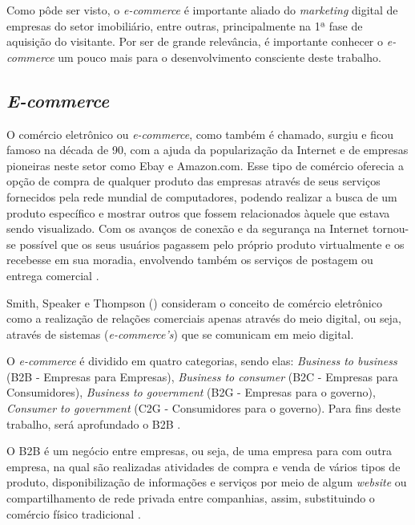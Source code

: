 Como pôde ser visto, o \textit{e-commerce} é importante aliado do \textit{marketing} digital de empresas do setor imobiliário, entre outras, principalmente na 1ª fase de aquisição do visitante. Por ser de grande relevância, é importante conhecer o \textit{e-commerce} um pouco mais para o desenvolvimento consciente deste trabalho.

\subsection{\textit{E-commerce}}

O comércio eletrônico ou \textit{e-commerce}, como também é chamado, surgiu e ficou famoso na década de 90, com a ajuda da popularização da Internet e de empresas pioneiras neste setor como Ebay e Amazon.com. Esse tipo de comércio oferecia a opção de compra de qualquer produto das empresas através de seus serviços fornecidos pela rede mundial de computadores, podendo realizar a busca de um produto específico e mostrar outros que fossem relacionados àquele que estava sendo visualizado. Com os avanços de conexão e da segurança na Internet tornou-se possível que os seus usuários pagassem pelo próprio produto virtualmente e os recebesse em sua moradia, envolvendo também os serviços de postagem ou entrega comercial \cite{Nakamura:2011}.

Smith, Speaker e Thompson (\citeyear{smith2000mais}) consideram o conceito de comércio eletrônico como a realização de relações comerciais apenas através do meio digital, ou seja, através de sistemas (\textit{e-commerce's}) que se comunicam em meio digital.

O \textit{e-commerce} é dividido em quatro categorias, sendo elas: \textit{Business to business} (B2B - Empresas para Empresas), \textit{Business to consumer} (B2C - Empresas para Consumidores), \textit{Business to government} (B2G - Empresas para o governo), \textit{Consumer to government} (C2G - Consumidores para o governo). Para fins deste trabalho, será aprofundado o B2B \cite{Nakamura:2011}.

O B2B é um negócio entre empresas, ou seja, de uma empresa para com outra empresa, na qual são realizadas atividades de compra e venda de vários tipos de produto, disponibilização de informações e serviços por meio de algum \textit{website} ou compartilhamento de rede privada entre companhias, assim, substituindo o comércio físico tradicional \cite{Nakamura:2011}.

